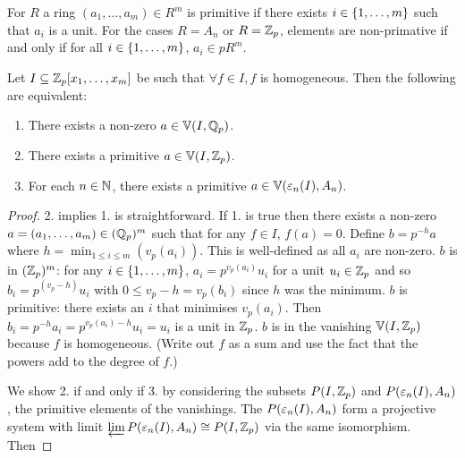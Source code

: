 \begin{dfn}
    For $R$ a ring $(a_1, \dots, a_m) \in R^m$ is primitive if
    there exists $i \in \left\{1,\dots,m\right\}$ such that $a_i$ is a unit.
    For the cases $R = A_n$ or $R = \mathbb{Z}_p$, 
    elements are non-primative if and only if for all 
    $i \in \left\{1,\dots,m\right\}$, $a_i \in p R^m$.
\end{dfn}

\begin{prop}
    Let $I \subseteq \mathbb{Z}_p[x_1,\dots, x_m]$ be such that 
    $\forall f \in I, f$ is homogeneous.
    Then the following are equivalent:
    \begin{enumerate}
        \item There exists a non-zero $a \in \mathbb{V}(I,\mathbb{Q}_p)$.
        \item There exists a primitive $a \in \mathbb{V}(I,\mathbb{Z}_p)$.
        \item For each $n \in \mathbb{N}$, 
            there exists a primitive $a \in \mathbb{V}(\varepsilon_n(I),A_n)$.
    \end{enumerate}
\end{prop}
\begin{proof}
    2. implies 1. is straightforward. 
    If 1. is true then there exists a non-zero 
    $a = (a_1,\dots,a_m) \in (\mathbb{Q}_p)^m$
    such that for any $f \in I$, $f(a)=0$.
    Define $b = p^{-h} a$ where $h = \min_{1 \le i \le m} (v_p(a_i))$.
    This is well-defined as all $a_i$ are non-zero.
    $b$ is in $(\mathbb{Z}_p)^m$: for any $i \in \left\{1, \dots ,m\right\}$,
    $a_i = p^{v_p(a_i)} u_i$ for a unit $u_i \in \mathbb{Z}_p$ and so
    $b_i = p^(v_p - h) u_i$ with $0 \le v_p - h = v_p(b_i)$
    since $h$ was the minimum.
    $b$ is primitive: 
    there exists an $i$ that minimises $v_p(a_i)$.
    Then $b_i = p^{-h} a_i = p^{v_p(a_i) - h} u_i = u_i$ 
    is a unit in $\mathbb{Z}_p$.
    $b$ is in the vanishing $\mathbb{V}(I,\mathbb{Z}_p)$ because $f$ is homogeneous.
    (Write out $f$ as a sum and use the fact that the powers add to 
    the degree of $f$.)

    We show 2. if and only if 3. by considering the subsets
    $P(I, \mathbb{Z}_p)$ and $P(\varepsilon_n(I),A_n)$, 
    the primitive elements of the vanishings.
    The $P(\varepsilon_n(I),A_n)$ form a projective system with limit
    $\varprojlim P(\varepsilon_n(I),A_n) \cong P(I, \mathbb{Z}_p)$ via the same
    isomorphism. 
    Then 
\end{proof}

